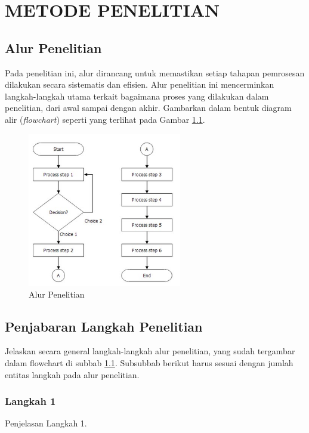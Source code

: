 \newpage
\chapter{METODE PENELITIAN} \label{Bab III}

\section{Alur Penelitian} \label{III.Alur}
Pada penelitian ini, alur dirancang untuk memastikan setiap tahapan pemrosesan dilakukan secara sistematis dan efisien. Alur penelitian ini mencerminkan langkah-langkah utama terkait bagaimana proses yang dilakukan dalam penelitian, dari awal sampai dengan akhir. Gambarkan dalam bentuk diagram alir (\textit{flowchart}) seperti yang terlihat pada Gambar \ref{fig:3.alur}. \par

\begin{figure}[H] %
    \centering
    \includegraphics[width=0.6\textwidth]{figure/flowchart.jpg}
    \caption{Alur Penelitian}
    \label{fig:3.alur}
\end{figure}

\section{Penjabaran Langkah Penelitian} \label{III.Jabar Alur}
Jelaskan secara general langkah-langkah alur penelitian, yang sudah tergambar dalam flowchart di subbab \ref{III.Alur}. Subsubbab berikut harus sesuai dengan jumlah entitas langkah pada alur penelitian. \par

\subsection{Langkah 1} \label{III.Langkah 1}
Penjelasan Langkah 1. \par

